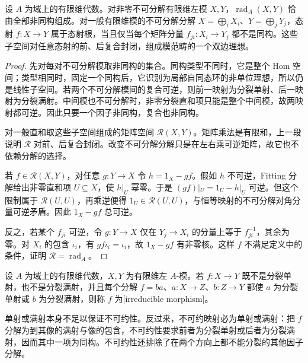 \begin{lemma}\label{b5:lem:morphism-radical-matrix}
	设 \(A\) 为域上的有限维代数。对非零不可分解有限维左模 \(X,Y\)，\(\operatorname{rad}_A(X,Y)\) 恰由全部非同构组成。对一般有限维模的不可分解分解 \(X=\bigoplus_iX_i\)、\(Y=\bigoplus_jY_j\)，态射 \(f:X\to Y\) 属于态射根，当且仅当每个矩阵分量 \(f_{ji}:X_i\to Y_j\) 都不是同构。这些子空间对任意态射的前、后复合封闭，组成模范畴的一个双边理想。
\end{lemma}
\begin{proof}
	先对每对不可分解模取非同构的集合。同构类型不同时，它是整个 Hom 空间；类型相同时，固定一个同构后，它识别为局部自同态环的非单位理想，所以仍是线性子空间。若两个不可分解模间的复合可逆，则前一映射为分裂单射、后一映射为分裂满射。中间模也不可分解时，非零分裂直和项只能是整个中间模，故两映射都可逆。因此只要一个因子非同构，复合也非同构。

	对一般直和取这些子空间组成的矩阵空间 \(\mathcal R(X,Y)\)。矩阵乘法是有限和，上一段说明 \(\mathcal R\) 对前、后复合封闭。改变不可分解分解只是在左右乘可逆矩阵，故它也不依赖分解的选择。

	若 \(f\in\mathcal R(X,Y)\)，对任意 \(g:Y\to X\) 令 \(h=1_X-gf\)。假如 \(h\) 不可逆，Fitting 分解给出非零直和项 \(U\subseteq X\)，使 \(h|_U\) 幂零。于是 \((gf)|_U=1_U-h|_U\) 可逆。但这个限制属于 \(\mathcal R(U,U)\)，再乘逆便得 \(1_U\in\mathcal R(U,U)\)，与恒等映射的不可分解对角分量可逆矛盾。因此 \(1_X-gf\) 总可逆。

	反之，若某个 \(f_{ji}\) 可逆，令 \(g:Y\to X\) 仅在 \(Y_j\to X_i\) 的分量上等于 \(f_{ji}^{-1}\)，其余为零。对 \(X_i\) 的包含 \(\iota_i\)，有 \(gf\iota_i=\iota_i\)，故 \(1_X-gf\) 有非零核。这样 \(f\) 不满足定义中的条件，证明 \(\mathcal R=\operatorname{rad}_A\)。
\end{proof}

\begin{definition}\label{b5:def:irreducible-morphism}
	设 \(A\) 为域上的有限维代数，\(X,Y\) 为有限维左 \(A\)-模。若 \(f:X\to Y\) 既不是分裂单射，也不是分裂满射，并且每个分解 \(f=ba\)、\(a:X\to Z\)、\(b:Z\to Y\) 都使 \(a\) 为分裂单射或 \(b\) 为分裂满射，则称 \(f\) 为[irreducible morphism]。
\end{definition}

单射或满射本身不足以保证不可约性。反过来，不可约映射必为单射或满射：把 \(f\) 分解为到其像的满射与像的包含，不可约性要求前者为分裂单射或后者为分裂满射，因而其中一项为同构。不可约性还排除了在两个方向上都不能分裂的其他因子分解。


